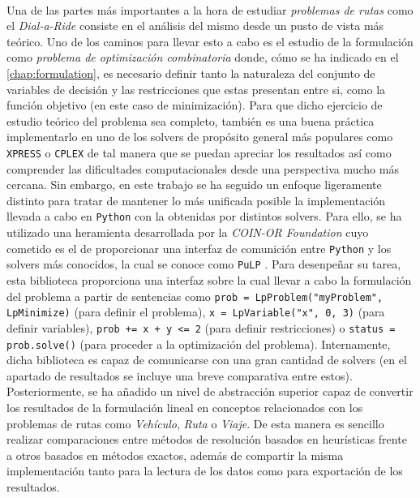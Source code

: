 \documentclass{subfiles}
\begin{document}
        \paragraph{}
        Una de las partes más importantes a la hora de estudiar \emph{problemas de rutas} como el \emph{Dial-a-Ride} consiste en el análisis del mismo desde un pusto de vista más teórico. Uno de los caminos para llevar esto a cabo es el estudio de la formulación como \emph{problema de optimización combinatoria} donde, cómo se ha indicado en el \cref{chap:formulation}, es necesario definir tanto la naturaleza del conjunto de variables de decisión y las restricciones que estas presentan entre si, como la función objetivo (en este caso de minimización). Para que dicho ejercicio de estudio teórico del problema sea completo, también es una buena práctica implementarlo en uno de los solvers de propósito general más populares como \texttt{XPRESS} o \texttt{CPLEX} de tal manera que se puedan apreciar los resultados así como comprender las dificultades computacionales desde una perspectiva mucho más cercana. Sin embargo, en este trabajo se ha seguido un enfoque ligeramente distinto para tratar de mantener lo más unificada posible la implementación llevada a cabo en \texttt{Python} con la obtenidas por distintos solvers. Para ello, se ha utilizado una heramienta desarrollada por la \emph{COIN-OR Foundation} cuyo cometido es el de proporcionar una interfaz de comunición entre \texttt{Python} y los solvers más conocidos, la cual se conoce como \texttt{PuLP} \cite{mitchell2011pulp}. Para desenpeñar su tarea, esta biblioteca proporciona una interfaz sobre la cual llevar a cabo la formulación del problema a partir de sentencias como \verb|prob = LpProblem("myProblem", LpMinimize)| (para definir el problema), \verb|x = LpVariable("x", 0, 3)| (para definir variables), \verb|prob += x + y <= 2| (para definir restricciones) o \verb|status = prob.solve()| (para proceder a la optimización del problema). Internamente, dicha biblioteca es capaz de comunicarse con una gran cantidad de solvers (en el apartado de resultados se incluye una breve comparativa entre estos). Posteriormente, se ha añadido un nivel de abstracción superior capaz de convertir los resultados de la formulación lineal en conceptos relacionados con los problemas de rutas como \emph{Vehículo}, \emph{Ruta} o \emph{Viaje}. De esta manera es sencillo realizar comparaciones entre métodos de resolución basados en heurísticas frente a otros basados en métodos exactos, además de compartir la misma implementación tanto para la lectura de los datos como para exportación de los resultados.
\end{document}
